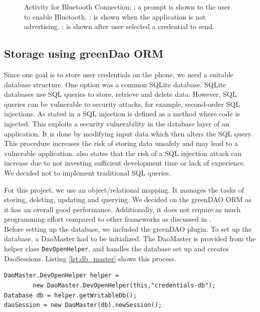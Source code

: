 \begin{figure}[H]
\caption[Activity for Bluetooth Connection]{Activity for Bluetooth Connection; \protect{}: a prompt is shown to the user to enable Bluetooth. \protect{}: is shown when the application is not advertising. \protect{}: is shown after user selected a credential to send.}
\label{fig:connectionactivity}
\end{figure}



\subsection{Storage using greenDao ORM}
Since one goal is to store user credentials on the phone, we need a suitable database structure. One option was a common SQLite database. SQLite databases use SQL queries to store, retrieve and delete data. However, SQL queries can be vulnerable to security attacks, for example, second-order SQL injections. As stated in \cite{katole2018detection} a SQL injection is defined as a method where code is injected. This exploits a security vulnerability in the database layer of an application. It is done by modifying input data which then alters the SQL query. This procedure increases the risk of storing data unsafely and may lead to a vulnerable application. \cite{katole2018detection} also states that the risk of a SQL injection attack can increase due to not investing sufficient development time or lack of experience. We decided not to implement traditional SQL queries.

For this project, we use an object/relational mapping. It manages the tasks of storing, deleting, updating and querying. We decided on the greenDAO ORM \cite{Greendao} as it has an overall good performance. Additionally, it does not require as much programming effort compared to other frameworks as discussed in \cite{DBLP:conf/mascots/PuST16}. \\
Before setting up the database, we included the greenDAO plugin. To set up the database, a DaoMaster had to be initialized. The DaoMaster is provided from the helper class \texttt{DevOpenHelper}, and handles the database set up and creates DaoSessions. Listing \ref{lst:db_master} shows this process.

\begin{lstlisting}[caption=Creation of database, label=lst:db_master]
DaoMaster.DevOpenHelper helper = 
        new DaoMaster.DevOpenHelper(this,"credentials-db");
Database db = helper.getWritableDb();
daoSession = new DaoMaster(db).newSession();
\end{lstlisting}
\vspace{0.5cm}

